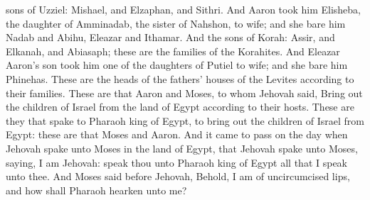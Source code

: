 sons of Uzziel: Mishael, and Elzaphan, and Sithri. And Aaron took him Elisheba, the daughter of Amminadab, the sister of Nahshon, to wife; and she bare him Nadab and Abihu, Eleazar and Ithamar. And the sons of Korah: Assir, and Elkanah, and Abiasaph; these are the families of the Korahites. And Eleazar Aaron’s son took him one of the daughters of Putiel to wife; and she bare him Phinehas. These are the heads of the fathers’ houses of the Levites according to their families. These are that Aaron and Moses, to whom Jehovah said, Bring out the children of Israel from the land of Egypt according to their hosts. These are they that spake to Pharaoh king of Egypt, to bring out the children of Israel from Egypt: these are that Moses and Aaron.  And it came to pass on the day when Jehovah spake unto Moses in the land of Egypt, that Jehovah spake unto Moses, saying, I am Jehovah: speak thou unto Pharaoh king of Egypt all that I speak unto thee. And Moses said before Jehovah, Behold, I am of uncircumcised lips, and how shall Pharaoh hearken unto me? 


